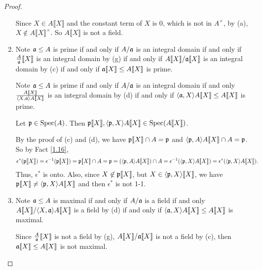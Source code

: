 \begin{proof}
\begin{enumerate}
            Since $X \in A\llbracket X \rrbracket$ and the constant term of $X$ is 0, which is not in $A^\times$, by (a), $X \not \in A\llbracket X \rrbracket^\times$. So $A\llbracket X \rrbracket$ is not a field.
        \item 
            Note $\mathfrak{a} \leq A$ is prime if and only if $A/\mathfrak{a}$ is an integral domain if and only if $\frac{A}{\mathfrak{a}}\llbracket X \rrbracket$ is an integral domain by (g) if and only if $A\llbracket X \rrbracket/\mathfrak{a} \llbracket X \rrbracket$ is an integral domain by (c) if and only if $\mathfrak{a}\llbracket X \rrbracket \leq A \llbracket X \rrbracket$ is prime. \par 
            Note $\mathfrak{a} \leq A$ is prime if and only if $A/\mathfrak{a}$ is an integral domain if and only $\frac{A\llbracket X \rrbracket}{\langle X,\mathfrak{a} \rangle A\llbracket X \rrbracket}$ is an integral domain by (d) if and only if $\langle \mathfrak{a},X \rangle A\llbracket X \rrbracket \leq A\llbracket X \rrbracket$ is prime. \par
            Let $\mathfrak{p} \in \operatorname{Spec}(A)$. Then $\mathfrak{p}\llbracket X \rrbracket, \langle \mathfrak{p},X \rangle A\llbracket X \rrbracket \in \operatorname{Spec}(A\llbracket X \rrbracket)$. \par 
            By the proof of (c) and (d), we have $\mathfrak{p} \llbracket X \rrbracket \cap A = \mathfrak{p}$ and $\langle \mathfrak{p},A \rangle A\llbracket X \rrbracket \cap A = \mathfrak{p}$. So by Fact \ref{1.16},
            \begin{align*}
                \epsilon^*(\mathfrak{p} \llbracket X \rrbracket) & = \epsilon^{-1}(\mathfrak{p} \llbracket X \rrbracket) = \mathfrak{p} \llbracket X \rrbracket \cap A = \mathfrak{p} = (\langle \mathfrak{p},A \rangle A\llbracket X \rrbracket) \cap A = \epsilon^{-1}(\langle \mathfrak{p},X \rangle A\llbracket X \rrbracket) = \epsilon^*(\langle \mathfrak{p},X \rangle A\llbracket X \rrbracket). 
            \end{align*}
            Thus, $\epsilon^*$ is onto. Also, since $X \not \in \mathfrak{p} \llbracket X \rrbracket$, but $X \in \langle \mathfrak{p},X \rangle \llbracket X \rrbracket$, we have $\mathfrak{p}\llbracket X \rrbracket \neq \langle \mathfrak{p},X \rangle A\llbracket X \rrbracket$ and then $\epsilon^*$ is not 1-1.
        \item 
            Note $\mathfrak{a} \leq A$ is maximal if and only if $A/\mathfrak{a}$ is a field if and only $A\llbracket X \rrbracket / \langle X,\mathfrak{a} \rangle A\llbracket X \rrbracket$ is a field by (d) if and only if $\langle \mathfrak{a},X \rangle A\llbracket X \rrbracket \leq A\llbracket X \rrbracket$ is maximal. \par 
            Since $\frac{A}{\mathfrak{a}}\llbracket X \rrbracket$ is not a field by (g), $A\llbracket X \rrbracket / \mathfrak{a} \llbracket X \rrbracket$ is not a field by (c), then $\mathfrak{a} \llbracket X \rrbracket \leq A\llbracket X \rrbracket$ is not maximal. 

\end{enumerate}
\end{proof}
